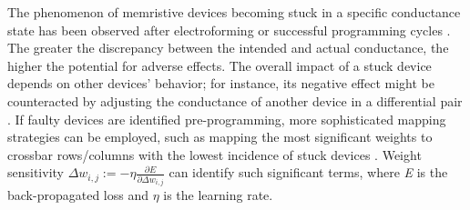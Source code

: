 



\noindent The phenomenon of memristive devices becoming stuck in a specific conductance state has been observed after electroforming or successful programming cycles \cite{joksas2022nonideality}. The greater the discrepancy between the intended and actual conductance, the higher the potential for adverse effects. The overall impact of a stuck device depends on other devices' behavior; for instance, its negative effect might be counteracted by adjusting the conductance of another device in a differential pair \cite{liu2017rescuing}. If faulty devices are identified pre-programming, more sophisticated mapping strategies can be employed, such as mapping the most significant weights to crossbar rows/columns with the lowest incidence of stuck devices \cite{gaol2021reliable}. Weight sensitivity  $\Delta w_{i,j} := - \eta \frac{\partial E}{\partial \Delta w_{i,j}}$ can identify such significant terms, where \textit{E} is the back-propagated loss and $\eta$ is the learning rate.\\


